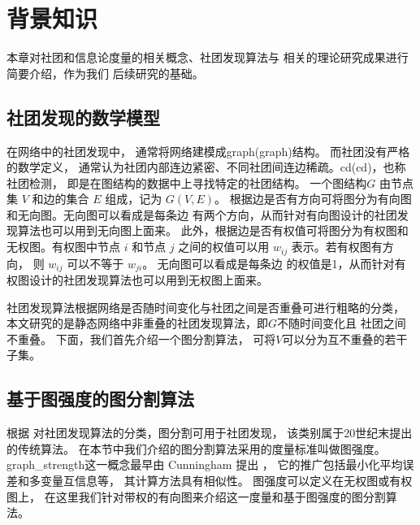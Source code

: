 
\chapter{背景知识}\label{chp:knowledge}
本章对社团和信息论度量的相关概念、社团发现算法与
相关的理论研究成果进行简要介绍，作为我们
后续研究的基础。
\section{社团发现的数学模型}\label{sec:community_detection}

在网络中的社团发现中，
通常将网络建模成\gls{graph}(\glsdesc{graph})结构。
而社团没有严格的数学定义，
通常认为社团内部连边紧密、不同社团间连边稀疏。\gls{cd}(\glsdesc{cd})，也称社团检测，
即是在图结构的数据中上寻找特定的社团结构。
一个图结构$G$ 由节点集 $V$ 和边的集合 $E$ 组成，记为 $G(V,E)$。
根据边是否有方向可将图分为有向图和无向图。无向图可以看成是每条边
有两个方向，从而针对有向图设计的社团发现算法也可以用到无向图上面来。
此外，根据边是否有权值可将图分为有权图和无权图。有权图中节点 $i$
和节点 $j$ 之间的权值可以用 $w_{ij}$ 表示。若有权图有方向，
则 $w_{ij}$ 可以不等于 $w_{ji}$。
无向图可以看成是每条边
的权值是1，从而针对有权图设计的社团发现算法也可以用到无权图上面来。

社团发现算法根据网络是否随时间变化与社团之间是否重叠可进行粗略的分类，
本文研究的是静态网络中非重叠的社团发现算法，即$G$不随时间变化且
社团之间不重叠。
下面，我们首先介绍一个图分割算法，
可将$V$可以分为互不重叠的若干子集。

\section{基于图强度的图分割算法}\label{sec:graph_strength}
根据\citet{fortunato2010community} 对社团发现算法的分类，图分割可用于社团发现，
该类别属于20世纪末提出的传统算法。
在本节中我们介绍的图分割算法采用的度量标准叫做图强度。
\gls{graph_strength}这一概念最早由 Cunningham 提出 \cite{cunningham1985optimal}，
它的推广包括最小化平均误差\cite{mac}和多变量互信息\cite{chan2016ic}等，
其计算方法具有相似性。
图强度可以定义在无权图或有权图上，
在这里我们针对带权的有向图来介绍这一度量和基于图强度的图分割算法。

